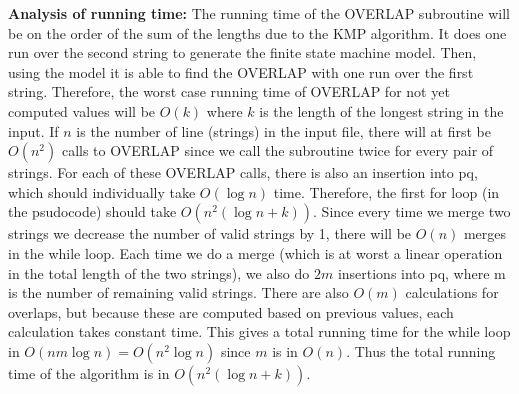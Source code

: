 \documentclass[11pt]{article}
\begin{document}
\noindent
\textbf{Analysis of running time:} \newline
\indent The running time of the OVERLAP subroutine will be on the order of the sum of the lengths due to the KMP algorithm. It does one run over the second string to generate the finite state machine model.  Then, using the model it is able to find the OVERLAP with one run over the first string. Therefore, the worst case running time of OVERLAP for not yet computed values will be $O(k)$ where $k$ is the length of the longest string in the input. \newline
\indent If $n$ is the number of line (strings) in the input file, there will at first be $O(n^2)$ calls to OVERLAP since we call the subroutine twice for every pair of strings. For each of these OVERLAP calls, there is also an insertion into pq, which should individually take $O(\log n)$ time. Therefore, the first for loop (in the psudocode) should take $O(n^2(\log n + k))$. \newline
\indent Since every time we merge two strings we decrease the number of valid strings by 1, there will be $O(n)$ merges in the while loop.  Each time we do a merge (which is at worst a linear operation in the total length of the two strings), we also do $2m$ insertions into pq, where m is the number of remaining valid strings.  There are also $O(m)$ calculations for overlaps, but because these are computed based on previous values, each calculation takes constant time.  This gives a total running time for the while loop in $O(nm\log n) = O(n^2\log n)$ since $m$ is in $O(n)$. \newline
\indent Thus the total running time of the algorithm is in $O(n^2(\log n + k))$.
\end{document}
